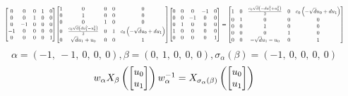 \documentclass[11pt]{article}
\theoremstyle{definition}
\begin{document}
\[
\scaletoalign{\textwidth}{{\left[\begin{matrix}0 & 0 & 0 & 1 & 0\\0 & 0 & 1 & 0 & 0\\0 & -1 & 0 & 0 & 0\\-1 & 0 & 0 & 0 & 0\\0 & 0 & 0 & 0 & 1\end{matrix}\right]} {\left[\begin{matrix}1 & 0 & 0 & 0 & 0\\0 & 1 & 0 & 0 & 0\\0 & 0 & 1 & 0 & 0\\0 & \frac{c_{0} \sqrt{d} \left(d u_{1}^{2} - u_{0}^{2}\right)}{2} & 0 & 1 & c_{0} \left(- \sqrt{d} u_{0} + d u_{1}\right)\\0 & \sqrt{d} u_{1} + u_{0} & 0 & 0 & 1\end{matrix}\right]} {\left[\begin{matrix}0 & 0 & 0 & -1 & 0\\0 & 0 & -1 & 0 & 0\\0 & 1 & 0 & 0 & 0\\1 & 0 & 0 & 0 & 0\\0 & 0 & 0 & 0 & 1\end{matrix}\right]} = {\left[\begin{matrix}1 & 0 & \frac{c_{0} \sqrt{d} \left(- d u_{1}^{2} + u_{0}^{2}\right)}{2} & 0 & c_{0} \left(- \sqrt{d} u_{0} + d u_{1}\right)\\0 & 1 & 0 & 0 & 0\\0 & 0 & 1 & 0 & 0\\0 & 0 & 0 & 1 & 0\\0 & 0 & - \sqrt{d} u_{1} - u_{0} & 0 & 1\end{matrix}\right]}}
\]
\[
\alpha = \left( -1, \  -1, \  0, \  0, \  0\right), \beta = \left( 0, \  1, \  0, \  0, \  0\right), \sigma_{\alpha}(\beta) = \left( -1, \  0, \  0, \  0, \  0\right)
\]
\[
\scaletoalign{\textwidth}{w_{\alpha} X_{\beta}\left(\left[\begin{matrix}u_{0}\\u_{1}\end{matrix}\right]\right) w_{\alpha}^{-1} = X_{\sigma_{\alpha}\left(\beta\right)}\left(\left[\begin{matrix}u_{0}\\u_{1}\end{matrix}\right]\right)}
\]
\end{document}
